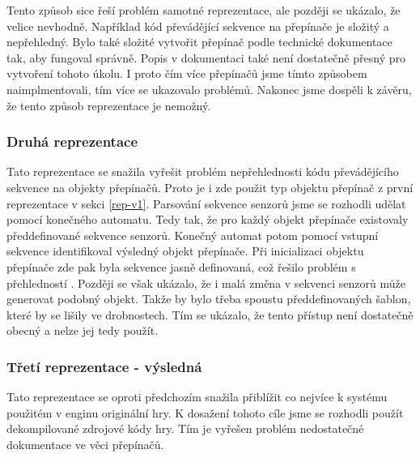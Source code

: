 Tento způsob sice řeší problém samotné reprezentace, ale později se ukázalo, že velice nevhodně. Například
kód převádějící sekvence na přepínače je složitý a nepřehledný. Bylo také složité vytvořit přepínač podle technické dokumentace\cite{TechnicalDocumentationFontanel05}
tak, aby fungoval správně. Popis v dokumentaci\cite{TechnicalDocumentationFontanel05} také není dostatečně přesný pro vytvoření tohoto úkolu.
I proto čím více přepínačů jsme tímto způsobem naimplmentovali, tím více se ukazovalo problémů. Nakonec jsme dospěli k závěru, že tento způsob reprezentace je nemožný.

\subsubsection{Druhá reprezentace}

Tato reprezentace se snažila vyřešit problém nepřehlednosti kódu převádějícího sekvence na objekty přepínačů.
Proto je i zde použit typ objektu přepínač z první reprezentace v sekci \ref{rep-v1}. Parsování sekvence senzorů jsme se rozhodli udělat pomocí konečného 
automatu. Tedy tak, že pro každý objekt přepínače existovaly předdefinované sekvence senzorů. Konečný automat potom pomocí vstupní sekvence
identifikoval výsledný objekt přepínače. Při inicializaci objektu přepínače zde pak byla sekvence jasně definovaná, což řešilo problém s přehledností .
Později se však ukázalo, že i malá změna v sekvenci senzorů může generovat podobný objekt. Takže by bylo třeba
spoustu předdefinovaných šablon, které by se lišily ve drobnostech. Tím se ukázalo, že tento přístup není dostatečně obecný a nelze jej tedy použít. 

\subsubsection{Třetí reprezentace - výsledná}

Tato reprezentace se oproti předchozím snažila přiblížit co nejvíce k systému použitém v enginu originální hry.
K dosažení tohoto cíle jsme se rozhodli použít dekompilované zdrojové kódy\cite{DMDecompilation} hry. Tím
je vyřešen problém nedostatečné dokumentace ve věci přepínačů.

